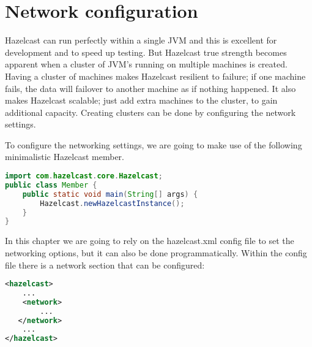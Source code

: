 \chapter{Network configuration}

Hazelcast can run perfectly within a single JVM and this is excellent for development and to speed up testing. But Hazelcast true strength becomes apparent when a cluster of JVM's running on multiple machines is created. Having a cluster of machines makes Hazelcast resilient to failure; if one machine fails, the data will failover to another machine as if nothing happened. It also makes Hazelcast scalable; just add extra machines to the cluster, to gain additional capacity. Creating clusters can be done by configuring the network settings.

To configure the networking settings, we are going to make use of the following minimalistic Hazelcast member.
\begin{lstlisting}[language=java]
import com.hazelcast.core.Hazelcast;
public class Member {
    public static void main(String[] args) {
        Hazelcast.newHazelcastInstance();
    }
}
\end{lstlisting}

In this chapter we are going to rely on the hazelcast.xml config file to set the networking options, but it can also be done programmatically. Within the config file there is a network section that can be configured:
\begin{lstlisting}[language=xml]
<hazelcast>
    ...
    <network>
        ...  
   </network>
    ...
</hazelcast>
\end{lstlisting}


